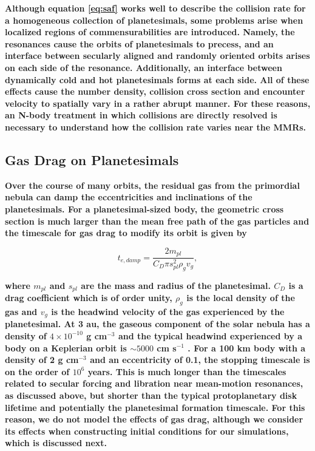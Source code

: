 \documentclass[fleqn,usenatbib]{mnras}
\begin{document}
\textbf{Although equation \ref{eq:saf} works well to describe the collision rate for a homogeneous collection of planetesimals, some problems arise when localized regions of commensurabilities are introduced. Namely, the resonances cause the orbits of planetesimals to precess, and an interface between secularly aligned and randomly oriented orbits arises on each side of the resonance. Additionally, an interface between dynamically cold and hot planetesimals forms at each side. All of these effects cause the number density, collision cross section and encounter velocity to spatially vary in a rather abrupt manner. For these reasons, an N-body treatment in which collisions are directly resolved is necessary to understand how the collision rate varies near the MMRs.}

\subsection{Gas Drag on Planetesimals}\label{sec:pl_drag}

\textbf{Over the course of many orbits, the residual gas from the primordial nebula can damp the eccentricities and inclinations of the planetesimals. For a planetesimal-sized body, the geometric cross section is much larger than the mean free path of the gas particles and the timescale for gas drag to modify its orbit is given by \citep{1976PThPh..56.1756A}}

\begin{equation}\label{eq:t_edamp}
    t_{e, damp} = \frac{2 m_{pl}}{C_{D} \pi s_{pl}^{2} \rho_{g} v_{g}},
\end{equation}

\textbf{\noindent where $m_{pl}$ and $s_{pl}$ are the mass and radius of the planetesimal. $C_{D}$ is a drag coefficient which is of order unity, $
\rho_{g}$ is the local density of the gas and $v_{g}$ is the headwind velocity of the gas experienced by the planetesimal. At 3 au, the gaseous component of the solar nebula has a density of $4 
\times 10^{-10}$ g cm$^{-3}$ and the typical headwind experienced by a body on a Keplerian orbit is $\sim 5000$ cm s$^{-1}$ \citep{1981PThPS..70...35H}. For a 100 km body with a 
density of 2 g cm$^{-3}$ and an eccentricity of 0.1, the stopping timescale is on the order of $10^{6}$ years. This is much longer than the timescales related to secular forcing and libration near mean-motion resonances, as discussed above, but shorter than the typical protoplanetary disk lifetime and potentially the planetesimal formation timescale. For this reason, we do not model the effects of gas drag, although we consider its effects when constructing initial conditions for our simulations, which is discussed next.}
\end{document}
